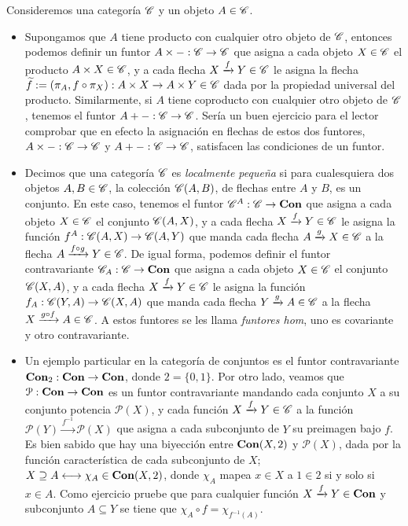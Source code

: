 \documentclass{comunicaciones}
\begin{document}
\begin{ej}\label{funtores en base a objetos}
    Consideremos una categoría $\mathscr C$ y un objeto $A\in\mathscr C$.
    \begin{itemize}
        \item Supongamos que $A$ tiene producto con cualquier otro objeto de $\mathscr C$, entonces podemos definir un funtor $A\times-:\mathscr C\to\mathscr C$ que asigna a cada
        objeto $X\in\mathscr C$ el producto $A\times X\in\mathscr C$, y a cada flecha $X\xrightarrow{f}Y\in\mathscr C$ le asigna la flecha $\widetilde{f}:=(\pi_A,f\circ\pi_X):A\times X\to A\times Y\in\mathscr C$ dada
        por la propiedad universal del producto. Similarmente, si $A$ tiene coproducto con cualquier otro objeto de $\mathscr C$, tenemos el funtor $A+-:\mathscr C\to\mathscr C$.
        Sería un buen ejercicio para el lector comprobar que en efecto la asignación en flechas de estos dos funtores, $A\times-:\mathscr C\to\mathscr C$ y 
        $A+-:\mathscr C\to\mathscr C$, satisfacen las condiciones de un funtor.
        \item Decimos que una categoría $\mathscr C$ es \emph{localmente pequeña} si para cualesquiera dos objetos $A,B\in\mathscr C$, la colección $\mathscr C(A,B)$, de flechas
        entre $A$ y $B$, es un conjunto. En este caso, tenemos el funtor $\mathscr C^A:\mathscr C\to\mathbf{Con}$ que asigna a cada objeto $X\in\mathscr C$ el conjunto $\mathscr C(A,X)$, y a cada 
        flecha $X\xrightarrow{f}Y\in\mathscr C$ le asigna la función $f^A:\mathscr C(A,X)\to\mathscr C(A,Y)$ que manda cada flecha $A\xrightarrow{g}X\in\mathscr C$ a la flecha 
        $A\xrightarrow{f\circ g}Y\in\mathscr C$. De igual forma, podemos definir el funtor contravariante $\mathscr C_A:\mathscr C\to\mathbf{Con}$ que asigna a cada objeto $X\in\mathscr C$ el conjunto $\mathscr C(X,A)$, 
        y a cada flecha $X\xrightarrow{f}Y\in\mathscr C$ le asigna la función $f_A:\mathscr C(Y,A)\to\mathscr C(X,A)$ que manda cada flecha $Y\xrightarrow{g}A\in\mathscr C$ a la flecha
        $X\xrightarrow{g\circ f}A\in\mathscr C$. A estos funtores se les llama \emph{funtores hom}, uno es covariante y otro contravariante.
        \item Un ejemplo particular en la categoría de conjuntos es el funtor contravariante $\mathbf{Con}_2:\mathbf{Con}\to\mathbf{Con}$, donde $2=\{0,1\}$. Por otro lado, veamos que 
        $\mathcal{P}:\mathbf{Con}\to\mathbf{Con}$ es un funtor contravariante mandando cada conjunto $X$ a su conjunto potencia $\mathcal{P}(X)$, y cada función 
        $X\xrightarrow{f}Y\in\mathscr C$ a la función $\mathcal{P}(Y)\xrightarrow{f^{-1}}\mathcal{P}(X)$ que asigna a cada subconjunto de $Y$ su preimagen bajo $f$.
        Es bien sabido que hay una biyección entre $\mathbf{Con}(X,2)$ y $\mathcal{P}(X)$, dada por la función característica de cada subconjunto de $X$; 
        $X\supseteq A\longleftrightarrow \chi_A\in \mathbf{Con}(X,2)$, donde $\chi_A$ mapea $x\in X$ a $1\in 2$ si y solo si $x\in A$.
        Como ejercicio pruebe que para cualquier función $X\xrightarrow{f}Y\in\mathbf{Con}$ y subconjunto $A\subseteq Y$ se tiene que $\chi_A\circ f=\chi_{f^{-1}(A)}$.
    \end{itemize}
\end{ej}
\end{document}
